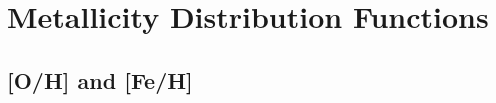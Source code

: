 \documentclass[fleqn, usenatbib]{mnras}
\begin{document}



\section{Metallicity Distribution Functions} 
\label{sec:mdfs} 

\subsection{[O/H] and [Fe/H]} 
\label{sec:mdfs:oh_feh} 
\end{document}
